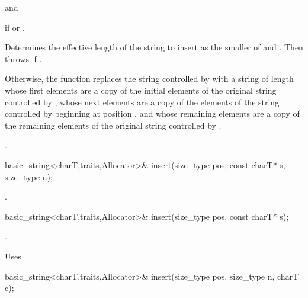\begin{itemdescr}
\pnum
\requires
{}
and

\pnum
\throws
{}
if
or
.

\pnum
\effects
Determines the effective length  of the string to insert as the smaller
of  and
. Then throws  if
.

Otherwise, the function replaces the string controlled by 
with a string of length  whose first 
elements are a copy of the initial elements of the original string controlled
by , whose next  elements are a copy of the elements
of the string controlled by  beginning at position ,
and whose remaining elements are a copy of the remaining elements of the
original string controlled by .

\pnum
\returns
{}.
\end{itemdescr}

%
%
\begin{itemdecl}
basic_string<charT,traits,Allocator>&
  insert(size_type pos, const charT* s, size_type n);
\end{itemdecl}

\begin{itemdescr}
\pnum
\returns
{}.
\end{itemdescr}

%
%
\begin{itemdecl}
basic_string<charT,traits,Allocator>&
  insert(size_type pos, const charT* s);
\end{itemdecl}

\begin{itemdescr}
\pnum
\returns
{}.

\pnum
\notes
Uses .
\end{itemdescr}

%
%
\begin{itemdecl}
basic_string<charT,traits,Allocator>&
  insert(size_type pos, size_type n, charT c);
\end{itemdecl}

